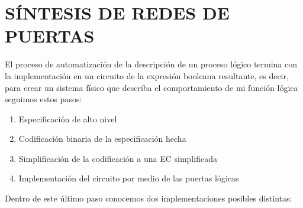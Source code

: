 \documentclass[a4paper,10pt]{book}
\begin{document}
\section*{SÍNTESIS DE REDES DE PUERTAS}
El proceso de automatización de la descripción de un proceso lógico termina con la implementación en un circuito de la expresión booleana resultante, es decir, para crear un sistema físico que describa el comportamiento de mi función lógica seguimos estos pasos:
\begin{enumerate}
\item Especificación de alto nivel
\item Codificación binaria de la especificación hecha
\item Simplificación de la codificación a una EC simplificada
\item Implementación del circuito por medio de las puertas lógicas
\end{enumerate}
Dentro de este último paso conocemos dos implementaciones posibles distintas:
\end{document}
